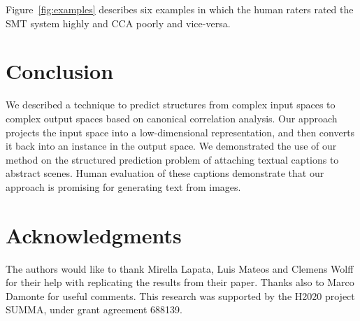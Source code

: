 \documentclass[letterpaper]{article}
\begin{document}
Figure~\ref{fig:examples} describes six examples in which the human raters rated the SMT system highly and CCA poorly and vice-versa.

\section{Conclusion}

We described a technique to predict structures from complex input spaces
to complex output spaces based on canonical correlation analysis.
Our approach projects the input space into a low-dimensional representation,
and then converts it back into an instance in the output space.
We demonstrated the use of our method on the structured prediction problem
of attaching textual captions to abstract scenes. Human evaluation of these
captions demonstrate that our approach is promising for generating text
from images.

\section*{Acknowledgments}

The authors would like to thank Mirella Lapata, Luis Mateos and Clemens Wolff
for their help with replicating the results from their paper.
Thanks also to Marco Damonte for useful comments.
This research was supported by the H2020 project SUMMA, under grant agreement 688139.
\end{document}
